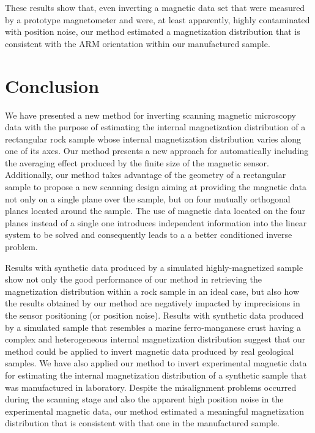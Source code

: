 \documentclass[galley,gc]{agutex}
\begin{document}
\begin{article}
These results show that, even inverting a magnetic data set that
were measured by a prototype magnetometer and were, at least apparently,
highly contaminated with position noise, our method estimated a 
magnetization distribution that is consistent with the ARM orientation
within our manufactured sample.

\section{Conclusion}

We have presented a new method for inverting scanning magnetic
microscopy data with the purpose of estimating the internal 
magnetization distribution of a rectangular rock sample whose
internal magnetization distribution varies along one of its
axes.
Our method presents a new approach for automatically including
the averaging effect produced by the finite size of the 
magnetic sensor. Additionally, our method takes advantage 
of the geometry of a rectangular sample
to propose a new scanning design aiming at providing the magnetic
data not only on a single plane over the sample, but on four 
mutually orthogonal planes located around the sample.
The use of magnetic data located on the four planes instead
of a single one introduces independent information into the
linear system to be solved and consequently leads to a
a better conditioned inverse problem.

Results with synthetic data produced by a simulated highly-magnetized 
sample show not only the good performance of 
our method in retrieving the magnetization distribution within a 
rock sample in an ideal case, but also how the results obtained by our 
method are negatively impacted by imprecisions in the sensor positioning
(or position noise).
Results with synthetic data produced by a simulated sample that 
resembles a marine ferro-manganese crust having a complex and heterogeneous 
internal magnetization distribution suggest that our method could be
applied to invert magnetic data produced by real geological samples.
We have also applied our method to invert experimental magnetic data
for estimating the internal magnetization 
distribution of a synthetic sample that was manufactured in 
laboratory.
Despite the misalignment problems occurred during the scanning stage
and also the apparent high position noise in the experimental magnetic
data, our method estimated a meaningful magnetization distribution that 
is consistent with that one in the manufactured sample.


\end{article}
\end{document}
